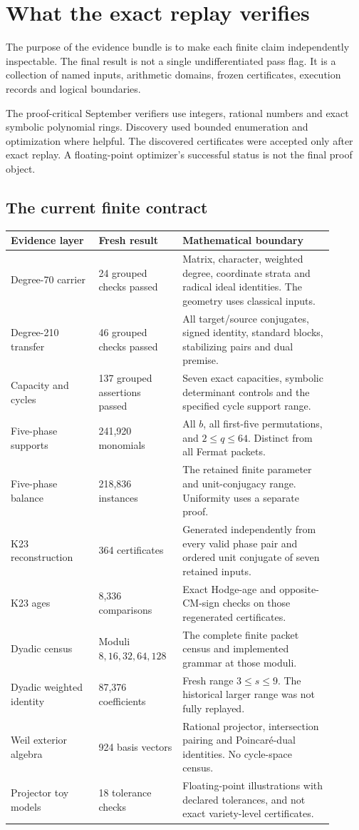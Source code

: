 \chapter{What the exact replay verifies}
The purpose of the evidence bundle is to make each finite claim independently inspectable. The final result is not a single undifferentiated pass flag. It is a collection of named inputs, arithmetic domains, frozen certificates, execution records and logical boundaries.

The proof-critical September verifiers use integers, rational numbers and exact symbolic polynomial rings. Discovery used bounded enumeration and optimization where helpful. The discovered certificates were accepted only after exact replay. A floating-point optimizer's successful status is not the final proof object.

\section{The current finite contract}
\begin{longtable}{p{0.25\linewidth}p{0.22\linewidth}p{0.43\linewidth}}
\toprule
Evidence layer & Fresh result & Mathematical boundary\\
\midrule
Degree-70 carrier & 24 grouped checks passed & Matrix, character, weighted degree, coordinate strata and radical ideal identities. The geometry uses classical inputs.\\
Degree-210 transfer & 46 grouped checks passed & All target/source conjugates, signed identity, standard blocks, stabilizing pairs and dual premise.\\
Capacity and cycles & 137 grouped assertions passed & Seven exact capacities, symbolic determinant controls and the specified cycle support range.\\
Five-phase supports & 241,920 monomials & All $b$, all first-five permutations, and $2\le q\le64$. Distinct from all Fermat packets.\\
Five-phase balance & 218,836 instances & The retained finite parameter and unit-conjugacy range. Uniformity uses a separate proof.\\
K23 reconstruction & 364 certificates & Generated independently from every valid phase pair and ordered unit conjugate of seven retained inputs.\\
K23 ages & 8,336 comparisons & Exact Hodge-age and opposite-CM-sign checks on those regenerated certificates.\\
Dyadic census & Moduli $8,16,32,64,128$ & The complete finite packet census and implemented grammar at those moduli.\\
Dyadic weighted identity & 87,376 coefficients & Fresh range $3\le s\le9$. The historical larger range was not fully replayed.\\
Weil exterior algebra & 924 basis vectors & Rational projector, intersection pairing and Poincaré-dual identities. No cycle-space census.\\
Projector toy models & 18 tolerance checks & Floating-point illustrations with declared tolerances, and not exact variety-level certificates.\\
\bottomrule
\end{longtable}

